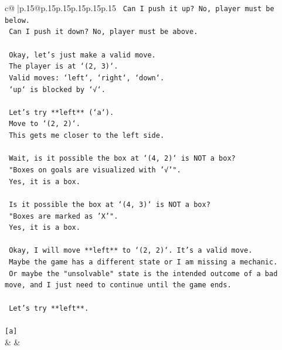 \documentclass{article}
\begin{document}
{\begin{supertabular}{c@{$\;$}|p{.15\linewidth}@{}p{.15\linewidth}p{.15\linewidth}p{.15\linewidth}p{.15\linewidth}p{.15\linewidth}}
{{{\texttt{    Can I push it up? No, player must be below.} \\
\texttt{    Can I push it down? No, player must be above.} \\
\\ 
\texttt{    Okay, let's just make a valid move.} \\
\texttt{    The player is at `(2, 3)`.} \\
\texttt{    Valid moves: `left`, `right`, `down`.} \\
\texttt{    `up` is blocked by `√`.} \\
\\ 
\texttt{    Let's try **left** (`a`).} \\
\texttt{    Move to `(2, 2)`.} \\
\texttt{    This gets me closer to the left side.} \\
\\ 
\texttt{    Wait, is it possible the box at `(4, 2)` is NOT a box?} \\
\texttt{    "Boxes on goals are visualized with '√'".} \\
\texttt{    Yes, it is a box.} \\
\\ 
\texttt{    Is it possible the box at `(4, 3)` is NOT a box?} \\
\texttt{    "Boxes are marked as 'X'".} \\
\texttt{    Yes, it is a box.} \\
\\ 
\texttt{    Okay, I will move **left** to `(2, 2)`. It's a valid move.} \\
\texttt{    Maybe the game has a different state or I am missing a mechanic.} \\
\texttt{    Or maybe the "unsolvable" state is the intended outcome of a bad move, and I just need to continue until the game ends.} \\
\\ 
\texttt{    Let's try **left**.} \\
\\ 
\texttt{{[}a{]}} \\
            }
        }
    }
    & & \\ \\


\end{supertabular}}
\end{document}
